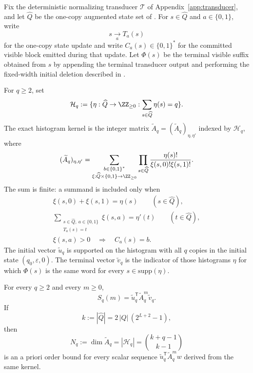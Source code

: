 \begin{definition}
\label{def:exact-histogram-kernel}
Fix the deterministic normalizing transducer \(\mathcal T\) of
Appendix~\ref{app:transducer}, and let \(\widehat Q\) be the one-copy augmented
state set of .  For
\(s\in\widehat Q\) and \(a\in\{0,1\}\), write
\[
  s \xrightarrow[a]{} T_a(s)
\]
for the one-copy state update and write \(C_a(s)\in\{0,1\}^*\) for the
committed visible block emitted during that update.  Let \(\Phi(s)\) be the
terminal visible suffix obtained from \(s\) by appending the terminal transducer
output and performing the fixed-width initial deletion described in
.

For \(q\ge2\), set
\[
  \mathcal H_q:=
  \{\eta:\widehat Q\to\ZZ_{\ge0}:\sum_{s\in\widehat Q}\eta(s)=q\}.
\]
The exact histogram kernel is the integer matrix
\(\widetilde A_q=(\widetilde A_q)_{\eta,\eta'}\) indexed by
\(\mathcal H_q\), where
\[
(\widetilde A_q)_{\eta,\eta'}
=
\sum_{\substack{b\in\{0,1\}^*\\
                \xi:\widehat Q\times\{0,1\}\to\ZZ_{\ge0}}}
\prod_{s\in\widehat Q}
\frac{\eta(s)!}{\xi(s,0)!\xi(s,1)!}.
\]
The sum is finite: a summand is included only when
\[
\begin{gathered}
  \xi(s,0)+\xi(s,1)=\eta(s)
  \qquad(s\in\widehat Q),\\
  \sum_{\substack{s\in\widehat Q,\ a\in\{0,1\}\\ T_a(s)=t}}\xi(s,a)=\eta'(t)
  \qquad(t\in\widehat Q),\\
  \xi(s,a)>0\quad\Longrightarrow\quad C_a(s)=b.
\end{gathered}
\]
The initial vector \(\widetilde u_q\) is supported on the histogram with all
\(q\) copies in the initial state \((q_0,\varepsilon,0)\).  The terminal vector
\(\widetilde v_q\) is the indicator of those histograms \(\eta\) for which
\(\Phi(s)\) is the same word for every \(s\in\mathrm{supp}(\eta)\).
\end{definition}

\begin{lemma}
\label{lem:exact-histogram-realization}
For every \(q\ge2\) and every \(m\ge0\),
\[
  S_q(m)=\widetilde u_q^{\mathsf T}\widetilde A_q^m\widetilde v_q.
\]
If
\[
  k:=|\widehat Q|=2\,|Q|\,(2^{L+2}-1),
\]
then
\[
  N_q:=\dim \widetilde A_q=|\mathcal H_q|=\binom{k+q-1}{k-1}
\]
is an a priori order bound for every scalar sequence
\(\widetilde u_q^{\mathsf T}\widetilde A_q^m w\) derived from the same kernel.
\end{lemma}

